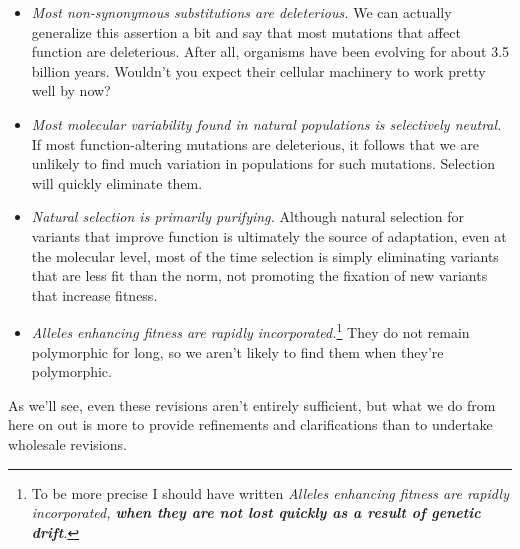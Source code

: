 \documentclass[12pt]{article}
\begin{document}
\begin{itemize}

\item {\it Most non-synonymous substitutions are deleterious.\/} We
  can actually generalize this assertion a bit and say that most
  mutations that affect function are deleterious. After all, organisms
  have been evolving for about 3.5 billion years. Wouldn't you expect
  their cellular machinery to work pretty well by now?

\item {\it Most molecular variability found in natural populations is
    selectively neutral.} If most function-altering mutations are
  deleterious, it follows that we are unlikely to find much variation
  in populations for such mutations. Selection will quickly eliminate
  them.

\item {\it Natural selection is primarily purifying.} Although natural
  selection for variants that improve function is ultimately the
  source of adaptation, even at the molecular level, most of the time
  selection is simply eliminating variants that are less fit than the
  norm, not promoting the fixation of new variants that increase
  fitness.

\item {\it Alleles enhancing fitness are rapidly
    incorporated.}\footnote{To be more precise I should have written
    {\it Alleles enhancing fitness are rapidly incorporated, {\bf when
        they are not lost quickly as a result of genetic drift}.\/}}
  They do not remain polymorphic for long, so we aren't likely to find
  them when they're polymorphic.

\end{itemize}

As we'll see, even these revisions aren't entirely sufficient, but
what we do from here on out is more to provide refinements and
clarifications than to undertake wholesale revisions.




\ccLicense
\end{document}
